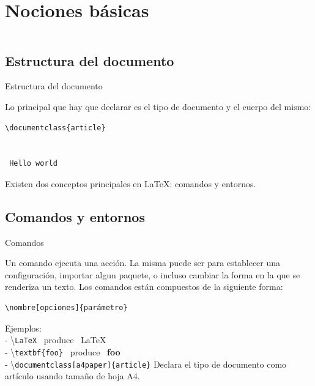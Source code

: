 \section{Nociones básicas}

\begin{frame}
    \begin{columns}[t]
        \begin{column}{.5\textwidth}
          \tableofcontents[sections={1-2},currentsection]
        \end{column}
        \begin{column}{.5\textwidth}
          \tableofcontents[sections={3-4},currentsection]
        \end{column}
    \end{columns}
\end{frame}

\subsection{Estructura del documento}
\begin{frame}[fragile]{Estructura del documento}

Lo principal que hay que declarar es el tipo de documento y el cuerpo del
mismo:

\begin{lstlisting}
\documentclass{article}


 Hello world

\end{lstlisting}

\pause
\vspace{5mm}
Existen dos conceptos principales en \LaTeX: comandos y entornos.

\end{frame}

\subsection{Comandos y entornos}
\begin{frame}[fragile]{Comandos}

Un comando ejecuta una acción. La misma puede ser para establecer una
configuración, importar algun paquete, o incluso cambiar la forma en la que se
renderiza un texto. Los comandos están compuestos de la siguiente forma:

\begin{verbatim}
\nombre[opciones]{parámetro}
\end{verbatim}

\pause

Ejemplos:\\[2mm]
- \textbackslash\texttt{LaTeX} ~produce~ \LaTeX\\
- \textbackslash\texttt{textbf\{foo\}} ~produce~ \textbf{foo}\\
- \textbackslash\texttt{documentclass[a4paper]\{article\}} Declara el tipo de documento como artículo usando tamaño de hoja A4.

\end{frame}

